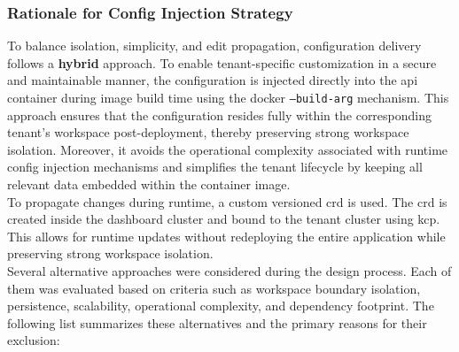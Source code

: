 \documentclass[11pt, a4paper, oneside, listof=totoc]{scrartcl}
\begin{document}
            \subsubsection{Rationale for Config Injection Strategy}\label{subsubsec:rationale}
                To balance isolation, simplicity, and edit propagation, configuration delivery
                follows a \textbf{hybrid} approach.
                To enable tenant-specific customization in a secure and maintainable manner, the
                configuration is injected directly into the \gls{api} container during image build
                time using the \gls{docker} \texttt{--build-arg} mechanism.
                This approach ensures that the configuration resides fully within the corresponding
                tenant's workspace post-deployment, thereby preserving strong workspace isolation.
                Moreover, it avoids the operational complexity associated with runtime config
                injection mechanisms and simplifies the tenant lifecycle by keeping all relevant
                data embedded within the container image.\\
                To propagate changes during runtime, a custom versioned \gls{crd} is used.
                The \gls{crd} is created inside the dashboard cluster and bound to the tenant
                cluster using \gls{kcp}.
                This allows for runtime updates without redeploying the entire application while
                preserving strong workspace isolation.
                \\
                Several alternative approaches were considered during the design process.
                Each of them was evaluated based on criteria such as workspace boundary isolation,
                persistence, scalability, operational complexity, and dependency footprint.
                The following list summarizes these alternatives and the primary reasons for their
                exclusion:
\end{document}
